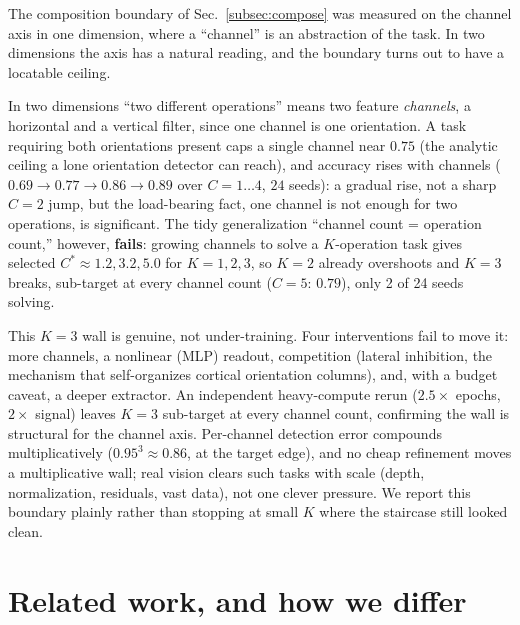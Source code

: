 \documentclass[11pt]{article}
\begin{document}
The composition boundary of Sec.~\ref{subsec:compose} was measured on the channel axis in one
dimension, where a ``channel'' is an abstraction of the task. In two dimensions the axis has a
natural reading, and the boundary turns out to have a locatable ceiling.

In two dimensions ``two different operations'' means two feature \emph{channels}, a horizontal and a
vertical filter, since one channel is one orientation. A task requiring both orientations present
caps a single channel near $0.75$ (the analytic ceiling a lone orientation detector can reach), and
accuracy rises with channels ($0.69 \to 0.77 \to 0.86 \to 0.89$ over $C{=}1{\ldots}4$, $24$ seeds): a
gradual rise, not a sharp $C{=}2$ jump, but the load-bearing fact, one channel is not enough for two
operations, is significant. The tidy generalization ``channel count = operation count,'' however,
\textbf{fails}: growing channels to solve a $K$-operation task gives selected $C^\ast \approx 1.2, 3.2,
5.0$ for $K{=}1,2,3$, so $K{=}2$ already overshoots and $K{=}3$ breaks, sub-target at every channel
count ($C{=}5$: $0.79$), only 2 of 24 seeds solving.

This $K{=}3$ wall is genuine, not under-training. Four interventions fail to move it: more channels, a
nonlinear (MLP) readout, competition (lateral inhibition, the mechanism that self-organizes cortical
orientation columns), and, with a budget caveat, a deeper extractor. An independent heavy-compute
rerun ($2.5\times$ epochs, $2\times$ signal) leaves $K{=}3$ sub-target at every channel count, confirming
the wall is structural for the channel axis. Per-channel detection error compounds multiplicatively
($0.95^3 \approx 0.86$, at the target edge), and no cheap refinement moves a multiplicative wall; real
vision clears such tasks with scale (depth, normalization, residuals, vast data), not one clever
pressure. We report this boundary plainly rather than stopping at small $K$ where the
staircase still looked clean.

\section{Related work, and how we differ}
\end{document}
